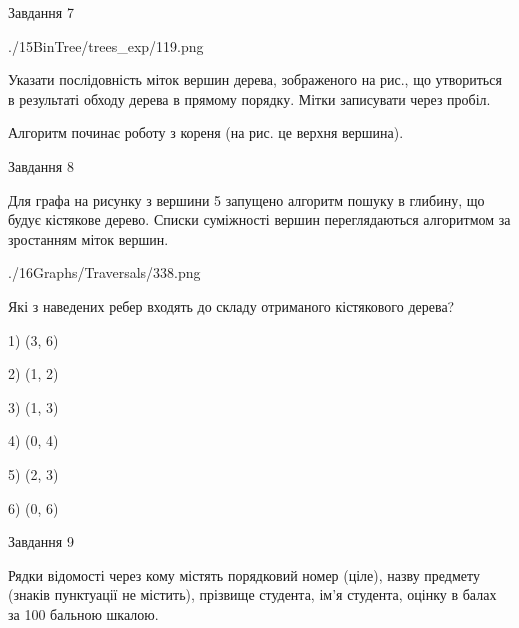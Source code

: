 \documentclass[12pt, ukrainian]{article}
\begin{document}
{\vspace{10mm}\par

\newpage
\begin{minipage}[t]{9.7cm}
               
{\begin{center}Завдання {7}\end{center}}
\vspace{-6mm}

\begin{center}
	{./15BinTree/trees_exp/119.png}
\end{center}
Указати послідовність міток вершин дерева, зображеного на рис., що утвориться в результаті обходу дерева в прямому порядку. Мітки записувати через пробіл.\par Алгоритм починає роботу з кореня (на рис. це верхня вершина).\par

\end{minipage}
\vline \hspace{8mm}
\begin{minipage}[t]{8.0cm}
               
{\begin{center}Завдання {8}\end{center}}
\vspace{-6mm}
Для графа на рисунку з вершини 5 запущено алгоритм пошуку в глибину, що будує кістякове дерево. Списки суміжності вершин переглядаються алгоритмом за зростанням міток вершин.\par
\begin{center}
	{./16Graphs/Traversals/338.png}
\end{center}
\par Які з наведених ребер входять до складу отриманого кістякового дерева?\par
1) (3, 6)\par
2) (1, 2)\par
3) (1, 3)\par
4) (0, 4)\par
5) (2, 3)\par
6) (0, 6)\par
{\vskip 15pt} \par

\end{minipage}

               
{\begin{center}Завдання {9}\end{center}}
\vspace{-6mm}
Рядки відомості через кому містять порядковий номер (ціле), назву предмету (зна\-ків пунктуації не містить), прізвище студента, ім'я студента, оцінку в балах за 100 бальною шкалою.

}
\end{document}
